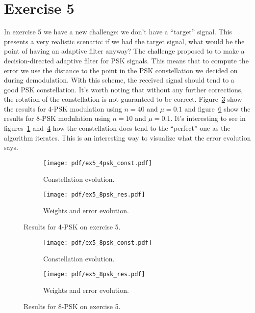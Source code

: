 \FloatBarrier
\section{Exercise 5}

In exercise 5 we have a new challenge: we don't have a ``target'' signal. This
presents a very realistic scenario: if we had the target signal, what would be the
point of having an adaptive filter anyway? The challenge proposed to to make a
decision-directed adaptive filter for PSK signals. This means that to compute the
error we use the distance to the point in the PSK constellation we decided on
during demodulation. With this scheme, the received signal should tend to a good
PSK constellation. It's worth noting that without any further corrections, the
rotation of the constellation is not guaranteed to be correct.
Figure~\ref{fig:ex5_4psk} show the results for 4-PSK modulation using \(n=40\) and
\(\mu=0.1\) and figure~\ref{fig:ex5_8psk} show the results for 8-PSK modulation
using \(n=10\) and \(\mu=0.1\). It's interesting to see in
figures~\ref{fig:ex5_4psk_const} and~\ref{fig:ex5_8psk_const} how the
constellation does tend to the ``perfect'' one as the algorithm iterates. This is
an interesting way to visualize what the error evolution says.
\begin{figure}[h!]
    \centering
    \begin{subfigure}[t]{0.32\columnwidth}
        \centering
        \texttt{[image: pdf/ex5\_4psk\_const.pdf]}
        \caption{Constellation evolution.\label{fig:ex5_4psk_const}}
    \end{subfigure} \hspace{1cm}
    \begin{subfigure}[t]{0.32\columnwidth}
        \centering
        \texttt{[image: pdf/ex5\_8psk\_res.pdf]}
        \caption{Weights and error evolution.\label{fig:ex5_4psk_res}}
    \end{subfigure}
    \caption{Results for 4-PSK on exercise 5.\label{fig:ex5_4psk}}
\end{figure}
\begin{figure}[h!]
    \centering
    \begin{subfigure}[t]{0.32\columnwidth}
        \centering
        \texttt{[image: pdf/ex5\_8psk\_const.pdf]}
        \caption{Constellation evolution.\label{fig:ex5_8psk_const}}
    \end{subfigure} \hspace{1cm}
    \begin{subfigure}[t]{0.32\columnwidth}
        \centering
        \texttt{[image: pdf/ex5\_8psk\_res.pdf]}
        \caption{Weights and error evolution.\label{fig:ex5_8psk_res}}
    \end{subfigure}
    \caption{Results for 8-PSK on exercise 5.\label{fig:ex5_8psk}}
\end{figure}
